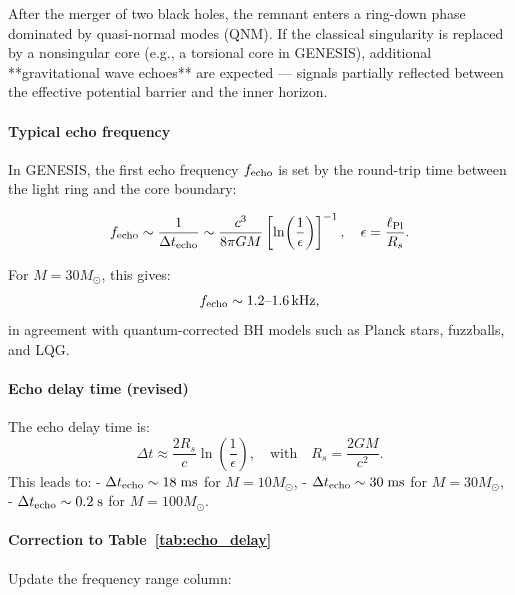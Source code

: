 \documentclass{article}
\begin{document}
After the merger of two black holes, the remnant enters a ring-down phase dominated by quasi-normal modes (QNM). If the classical singularity is replaced by a nonsingular core (e.g., a torsional core in GENESIS), additional **gravitational wave echoes** are expected — signals partially reflected between the effective potential barrier and the inner horizon.

\paragraph{Typical echo frequency}

In GENESIS, the first echo frequency \( f_{\rm echo} \) is set by the round-trip time between the light ring and the core boundary:

\begin{equation}
f_{\rm echo} \sim \frac{1}{\Delta t_{\rm echo}} \sim \frac{c^3}{8\pi G M} \left[ \ln\!\left( \frac{1}{\epsilon} \right) \right]^{-1},
\quad \epsilon = \frac{\ell_{\rm Pl}}{R_s}.
\end{equation}

For \(M = 30 M_\odot\), this gives:
\begin{equation}\label{eq:auto160}
f_{\rm echo} \sim 1.2\text{–}1.6\,\mathrm{kHz},
\end{equation}
in agreement with quantum-corrected BH models such as Planck stars, fuzzballs, and LQG.

\paragraph{Echo delay time (revised)}

The echo delay time is:
\begin{equation}\label{eq:auto161}
\Delta t \approx \frac{2R_s}{c} \ln\!\left(\frac{1}{\epsilon}\right),
\quad \text{with}\quad R_s = \frac{2GM}{c^2}.
\end{equation}
This leads to:
- \( \Delta t_{\rm echo} \sim 18\;\mathrm{ms} \) for \(M=10M_\odot\),
- \( \Delta t_{\rm echo} \sim 30\;\mathrm{ms} \) for \(M=30M_\odot\),
- \( \Delta t_{\rm echo} \sim 0.2\;\mathrm{s} \) for \(M=100M_\odot\).

\paragraph{Correction to Table~\ref{tab:echo_delay}}

Update the frequency range column:
\end{document}
